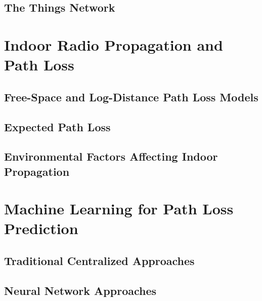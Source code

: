\documentclass[12pt, a4paper, twoside, openright]{report}
\begin{document}
\subsection{The Things Network}

\section{Indoor Radio Propagation and Path Loss}
\label{sec:path-loss-theory}

\subsection{Free-Space and Log-Distance Path Loss Models}

\subsection{Expected Path Loss}

\subsection{Environmental Factors Affecting Indoor Propagation}

\section{Machine Learning for Path Loss Prediction}
\label{sec:ml-pathloss}

\subsection{Traditional Centralized Approaches}

\subsection{Neural Network Approaches}
\end{document}
